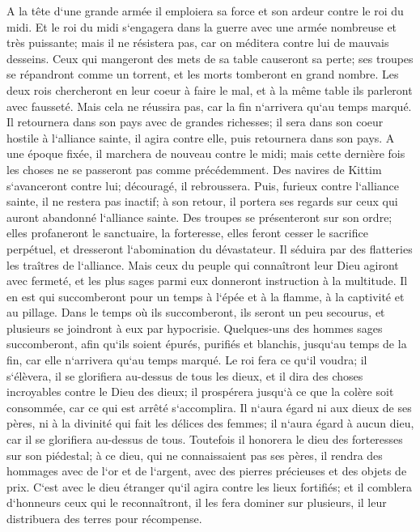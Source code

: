 \verse A la tête d`une grande armée il emploiera sa force et son ardeur contre le roi du midi. Et le roi du midi s`engagera dans la guerre avec une armée nombreuse et très puissante; mais il ne résistera pas, car on méditera contre lui de mauvais desseins. 
\verse Ceux qui mangeront des mets de sa table causeront sa perte; ses troupes se répandront comme un torrent, et les morts tomberont en grand nombre. 
\verse Les deux rois chercheront en leur coeur à faire le mal, et à la même table ils parleront avec fausseté. Mais cela ne réussira pas, car la fin n`arrivera qu`au temps marqué. 
\verse Il retournera dans son pays avec de grandes richesses; il sera dans son coeur hostile à l`alliance sainte, il agira contre elle, puis retournera dans son pays. 
\verse A une époque fixée, il marchera de nouveau contre le midi; mais cette dernière fois les choses ne se passeront pas comme précédemment. 
\verse Des navires de Kittim s`avanceront contre lui; découragé, il rebroussera. Puis, furieux contre l`alliance sainte, il ne restera pas inactif; à son retour, il portera ses regards sur ceux qui auront abandonné l`alliance sainte. 
\verse Des troupes se présenteront sur son ordre; elles profaneront le sanctuaire, la forteresse, elles feront cesser le sacrifice perpétuel, et dresseront l`abomination du dévastateur. 
\verse Il séduira par des flatteries les traîtres de l`alliance. Mais ceux du peuple qui connaîtront leur Dieu agiront avec fermeté, 
\verse et les plus sages parmi eux donneront instruction à la multitude. Il en est qui succomberont pour un temps à l`épée et à la flamme, à la captivité et au pillage. 
\verse Dans le temps où ils succomberont, ils seront un peu secourus, et plusieurs se joindront à eux par hypocrisie. 
\verse Quelques-uns des hommes sages succomberont, afin qu`ils soient épurés, purifiés et blanchis, jusqu`au temps de la fin, car elle n`arrivera qu`au temps marqué. 
\verse Le roi fera ce qu`il voudra; il s`élèvera, il se glorifiera au-dessus de tous les dieux, et il dira des choses incroyables contre le Dieu des dieux; il prospérera jusqu`à ce que la colère soit consommée, car ce qui est arrêté s`accomplira. 
\verse Il n`aura égard ni aux dieux de ses pères, ni à la divinité qui fait les délices des femmes; il n`aura égard à aucun dieu, car il se glorifiera au-dessus de tous. 
\verse Toutefois il honorera le dieu des forteresses sur son piédestal; à ce dieu, qui ne connaissaient pas ses pères, il rendra des hommages avec de l`or et de l`argent, avec des pierres précieuses et des objets de prix. 
\verse C`est avec le dieu étranger qu`il agira contre les lieux fortifiés; et il comblera d`honneurs ceux qui le reconnaîtront, il les fera dominer sur plusieurs, il leur distribuera des terres pour récompense. 
